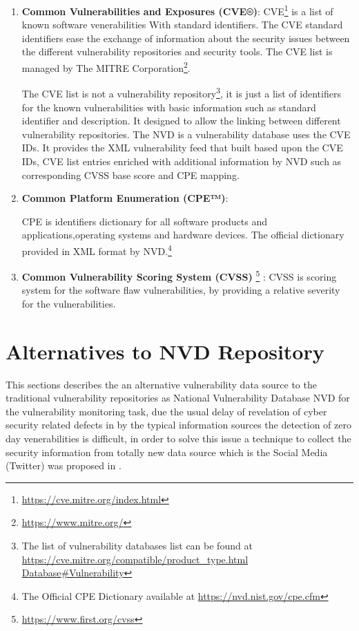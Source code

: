 \documentclass{llncs}
\begin{document}
 \begin{enumerate}
 \item \textbf{Common Vulnerabilities and Exposures (CVE®)}: CVE\footnote{\url{https://cve.mitre.org/index.html}} is a list of known software venerabilities With standard identifiers. The CVE standard identifiers ease the exchange of information about the security issues between the different vulnerability repositories and security tools. The CVE list is managed by The MITRE Corporation\footnote{\url{https://www.mitre.org/}}.
 \par
 The CVE list is not a vulnerability repository\footnote{The list of vulnerability databases list can be found at \url{https://cve.mitre.org/compatible/product_type.html Database\#Vulnerability}}, it is just a list of identifiers for the known vulnerabilities with basic information such as standard identifier and description. It designed to allow the linking between different vulnerability repositories. The NVD is a vulnerability database uses the CVE IDs. It provides the XML vulnerability feed that built based upon the CVE IDs, CVE list entries enriched with additional information by NVD such as corresponding CVSS base score and CPE mapping.    
 
 \item \textbf{Common Platform Enumeration (CPE™)}:
 
   CPE is identifiers dictionary for all software products and applications,operating systems and hardware devices. The official dictionary provided in XML format by NVD.\footnote{The Official CPE Dictionary available at \url{https://nvd.nist.gov/cpe.cfm}}
  
 \item \textbf{Common Vulnerability Scoring System (CVSS)} \footnote{\url{https://www.first.org/cvss}} :
   CVSS is scoring system for the software flaw vulnerabilities, by providing a relative severity for the vulnerabilities.
 \end{enumerate}
 

\section{Alternatives to NVD Repository}

\par This sections describes the an alternative vulnerability data source to the traditional vulnerability repositories as National Vulnerability Database NVD for the vulnerability monitoring task, due the usual delay of revelation of cyber security related defects in by the typical information sources the detection of zero day venerabilities is difficult, in order to solve this issue a technique to collect the security information from totally new data source which is the Social Media (Twitter) was proposed in \cite{paper2}.
\par
\end{document}
